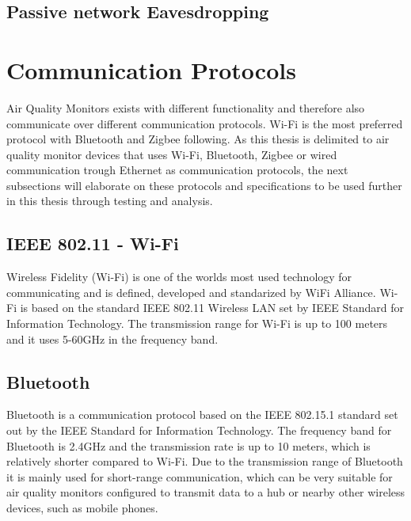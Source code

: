 \subsection*{Passive network Eavesdropping}

\section*{Communication Protocols}
Air Quality Monitors exists with different functionality and therefore also communicate over different communication protocols. Wi-Fi is the most preferred protocol with Bluetooth and Zigbee following. \cite{saini2020indoor} As this thesis is delimited to air quality monitor devices that uses Wi-Fi, Bluetooth, Zigbee or wired communication trough Ethernet as communication protocols, the next subsections will elaborate on these protocols and specifications to be used further in this thesis through testing and analysis. 

\subsection*{IEEE 802.11 - Wi-Fi}
Wireless Fidelity (Wi-Fi) \cite{WiFiAlliance} is one of the worlds most used technology for communicating and is defined, developed and standarized by WiFi Alliance. \cite{WiFiAlliance} Wi-Fi is based on the standard IEEE 802.11 Wireless LAN set by IEEE Standard for Information Technology. \cite{WifiStandard} The transmission range for Wi-Fi is up to 100 meters and it uses 5-60GHz in the frequency band. \cite{IAQMonitorCommunicationReview}

\subsection*{Bluetooth}
Bluetooth is a communication protocol based on the IEEE 802.15.1 standard set out by the IEEE Standard for Information Technology. The frequency band for Bluetooth is 2.4GHz and the transmission rate is up to 10 meters, which is relatively shorter compared to Wi-Fi. \cite{IAQMonitorCommunicationReview} Due to the transmission range of Bluetooth it is mainly used for short-range communication, which can be very suitable for air quality monitors configured to transmit data to a hub or nearby other wireless devices, such as mobile phones. 

